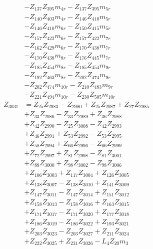 \begin{multicols}{2}
\begin{align}
&- Z_{137}Z_{395}m_{4r} - Z_{137}Z_{395}m_{5r}  \nonumber \\
&- Z_{140}Z_{403}m_{4r} - Z_{146}Z_{410}m_{5r}  \nonumber \\
&- Z_{146}Z_{410}m_{6r} - Z_{150}Z_{415}m_{5r}  \nonumber \\
&- Z_{157}Z_{422}m_{6r} - Z_{157}Z_{422}m_{7r}  \nonumber \\
&- Z_{162}Z_{429}m_{6r} - Z_{170}Z_{438}m_{7r}  \nonumber \\
&- Z_{170}Z_{438}m_{8r} - Z_{176}Z_{445}m_{7r}  \nonumber \\
&- Z_{185}Z_{454}m_{8r} - Z_{185}Z_{454}m_{9r}  \nonumber \\
&- Z_{192}Z_{463}m_{8r} - Z_{202}Z_{474}m_{9r}  \nonumber \\
&- Z_{202}Z_{474}m_{10r} - Z_{210}Z_{483}m_{9r}  \nonumber \\
&- Z_{221}Z_{494}m_{10r} - Z_{230}Z_{505}m_{10r} \nonumber \\
Z_{3031} &= Z_{25}Z_{2983} - Z_{2980} + Z_{25}Z_{2987} + Z_{27}Z_{2985}  \nonumber \\
&+ Z_{33}Z_{2986} - Z_{33}Z_{2989} + Z_{36}Z_{2988}  \nonumber \\
&+ Z_{42}Z_{2990} - Z_{25}Z_{3008} - Z_{42}Z_{2993}  \nonumber \\
&+ Z_{46}Z_{2991} + Z_{53}Z_{2992} - Z_{53}Z_{2995}  \nonumber \\
&+ Z_{58}Z_{2994} + Z_{66}Z_{2996} - Z_{66}Z_{2999}  \nonumber \\
&+ Z_{72}Z_{2997} + Z_{81}Z_{2998} - Z_{81}Z_{3001}  \nonumber \\
&+ Z_{88}Z_{3000} + Z_{98}Z_{3002} - Z_{98}Z_{3006}  \nonumber \\
&+ Z_{106}Z_{3003} + Z_{117}Z_{3004} + Z_{126}Z_{3005}  \nonumber \\
&+ Z_{138}Z_{3007} - Z_{138}Z_{3010} + Z_{141}Z_{3009}  \nonumber \\
&+ Z_{147}Z_{3011} - Z_{147}Z_{3014} + Z_{151}Z_{3012}  \nonumber \\
&+ Z_{158}Z_{3013} - Z_{158}Z_{3016} + Z_{163}Z_{3015}  \nonumber \\
&+ Z_{171}Z_{3017} - Z_{171}Z_{3020} + Z_{177}Z_{3018}  \nonumber \\
&+ Z_{186}Z_{3019} - Z_{186}Z_{3022} + Z_{193}Z_{3021}  \nonumber \\
&+ Z_{203}Z_{3023} - Z_{203}Z_{3027} + Z_{211}Z_{3024}  \nonumber \\
&+ Z_{222}Z_{3025} + Z_{231}Z_{3026} - L_4Z_{20}m_3  \nonumber \\

\end{align}
\end{multicols}

